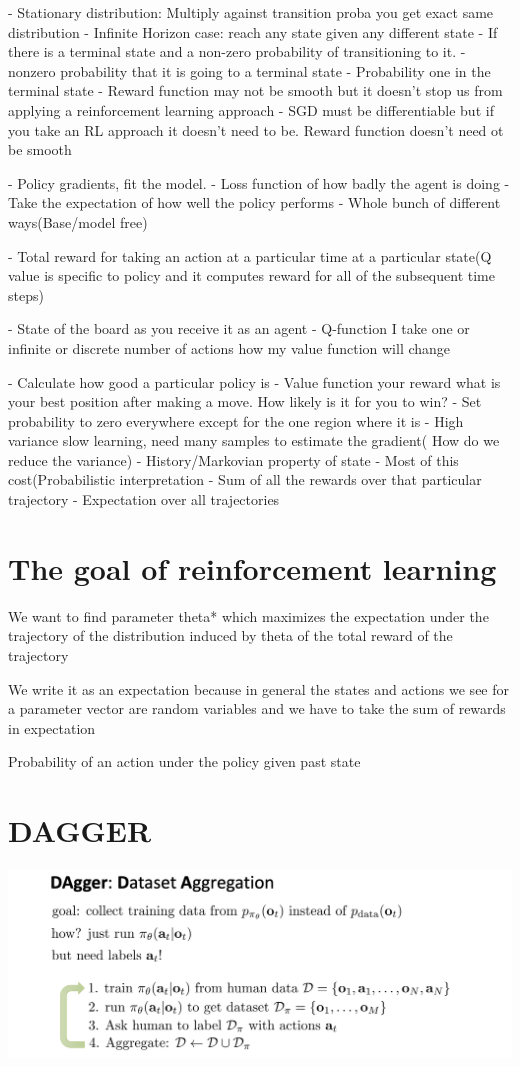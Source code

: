 \documentclass{article}
\begin{document}
- Stationary distribution: Multiply against transition proba you get exact same distribution
- Infinite Horizon case: reach any state given any different state
- If there is a terminal state and a non-zero probability of transitioning to it.
- nonzero probability that it is going to a terminal state
- Probability one in the terminal state
- Reward function may not be smooth but it doesn't stop us from applying a reinforcement learning approach
- SGD must be differentiable but if you take an RL approach it doesn't need to be. Reward function doesn't need ot be smooth

- Policy gradients, fit the model.
- Loss function of how badly the agent is doing
- Take the expectation of how well the policy performs
- Whole bunch of different ways(Base/model free)

- Total reward for taking an action at a particular time at a particular state(Q value is specific to policy and it computes reward for all of the subsequent time steps)


- State of the board as you receive it as an agent
- Q-function I take one or infinite or discrete number of actions how my value function will change

- Calculate how good a particular policy is
- Value function your reward what is your best position after making a move. How likely is it for you to win? 
- Set probability to zero everywhere except for the one region where it is 
- High variance slow learning, need many samples to estimate the gradient( How do we reduce the variance)
- History/Markovian property of state
- Most of this cost(Probabilistic interpretation
- Sum of all the rewards over that particular trajectory
- Expectation over all trajectories
\section{The goal of reinforcement learning }
We want to find  parameter theta* which maximizes the expectation under the trajectory of the distribution induced by theta of the total reward of the trajectory

We write it as an expectation because in general the states and actions we see for a parameter vector are random variables and we have to take the sum of rewards in expectation

Probability of an action under the policy given past state

\section{DAGGER}
\includegraphics[scale=0.5]{dagger}
\end{document}
